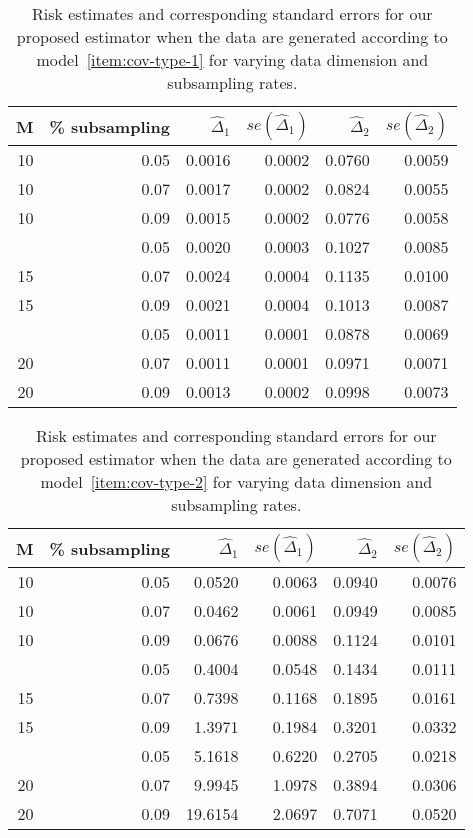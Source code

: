 \documentclass[12pt]{article}
\theoremstyle{definition}
\begin{document}
\begin{table}[H]
\centering
\begin{tabular}{rrrrrr}
  \hline
M & \% subsampling & $\hat{\Delta}_1$ & $se\left( \hat{\Delta}_1\right)$& $\hat{\Delta}_2$ & $se\left( \hat{\Delta}_2\right)$ \\ 
  \hline
10 & 0.05 & 0.0016 & 0.0002 & 0.0760 & 0.0059 \\ 
  10 & 0.07 & 0.0017 & 0.0002 & 0.0824 & 0.0055 \\ 
  10 & 0.09 & 0.0015 & 0.0002 & 0.0776 & 0.0058 \\ 
    \hdashline
  15 & 0.05 & 0.0020 & 0.0003 & 0.1027 & 0.0085 \\ 
  15 & 0.07 & 0.0024 & 0.0004 & 0.1135 & 0.0100 \\ 
  15 & 0.09 & 0.0021 & 0.0004 & 0.1013 & 0.0087 \\ 
    \hdashline
  20 & 0.05 & 0.0011 & 0.0001 & 0.0878 & 0.0069 \\ 
  20 & 0.07 & 0.0011 & 0.0001 & 0.0971 & 0.0071 \\ 
  20 & 0.09 & 0.0013 & 0.0002 & 0.0998 & 0.0073 \\ 
   \hline
\end{tabular}
\caption{Risk estimates and corresponding standard errors for our proposed estimator when the data are generated according to model~\ref{item:cov-type-1} for varying data dimension and subsampling rates.} 
\end{table}


\begin{table}[H]
\centering
\begin{tabular}{rrrrrr}
  \hline
M & \% subsampling & $\hat{\Delta}_1$ & $se\left( \hat{\Delta}_1\right)$& $\hat{\Delta}_2$ & $se\left( \hat{\Delta}_2\right)$ \\ 
  \hline
10 & 0.05 & 0.0520 & 0.0063 & 0.0940 & 0.0076 \\ 
  10 & 0.07 & 0.0462 & 0.0061 & 0.0949 & 0.0085 \\ 
  10 & 0.09 & 0.0676 & 0.0088 & 0.1124 & 0.0101 \\ 
    \hdashline
  15 & 0.05 & 0.4004 & 0.0548 & 0.1434 & 0.0111 \\ 
  15 & 0.07 & 0.7398 & 0.1168 & 0.1895 & 0.0161 \\ 
  15 & 0.09 & 1.3971 & 0.1984 & 0.3201 & 0.0332 \\ 
    \hdashline
  20 & 0.05 & 5.1618 & 0.6220 & 0.2705 & 0.0218 \\ 
  20 & 0.07 & 9.9945 & 1.0978 & 0.3894 & 0.0306 \\ 
  20 & 0.09 & 19.6154 & 2.0697 & 0.7071 & 0.0520 \\ 
   \hline
\end{tabular}
\caption{Risk estimates and corresponding standard errors for our proposed estimator when the data are generated according to model~\ref{item:cov-type-2} for varying data dimension and subsampling rates.} 
\end{table}
\end{document}
